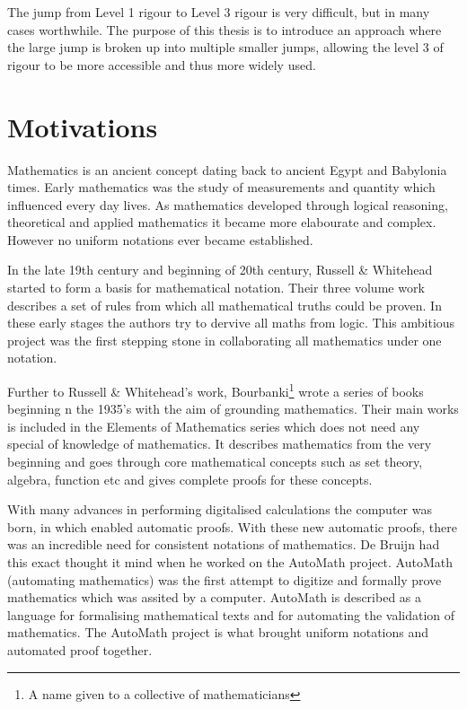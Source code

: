 The jump from Level 1 rigour to Level 3 rigour is very difficult, but in many cases worthwhile. The purpose of this thesis is to introduce an approach where the large jump is broken up into multiple smaller jumps, allowing the level 3 of rigour to be more accessible and thus more widely used. 

\section{Motivations}

Mathematics is an ancient concept dating back to ancient Egypt and Babylonia times. Early mathematics was the study of measurements and quantity which influenced every day lives. As mathematics developed through logical reasoning, theoretical and applied mathematics it became more elabourate and complex. However no uniform notations ever became established.

In the late 19th century and beginning of 20th century, Russell \& Whitehead \cite{whitehead1912principia} started to form a basis for mathematical notation. Their three volume work describes a set of rules from which all mathematical truths could be proven. In these early stages the authors try to dervive all maths from logic. This ambitious project was the first stepping stone in collaborating all mathematics under one notation.

Further to Russell \& Whitehead's work, Bourbanki\footnote{A name given to a collective of mathematicians} wrote a series of books beginning n the 1935's with the aim of grounding mathematics. Their main works is included in the Elements of Mathematics series \cite{opac-b1128208} which does not need any special of knowledge of mathematics. It describes mathematics from the very beginning and goes through core mathematical concepts such as set theory, algebra, function etc and gives complete proofs for these concepts.

With many advances in performing digitalised calculations the computer was born, in which enabled automatic proofs. With these new automatic proofs, there was an incredible need for consistent notations of mathematics. De Bruijn had this exact thought it mind when he worked on the AutoMath \cite{mv} project. AutoMath (automating mathematics) was the first attempt to digitize and formally prove mathematics which was assited by a computer. AutoMath is described as a language for formalising mathematical texts and for automating the validation of mathematics. The AutoMath project is what brought uniform notations and automated proof together.

